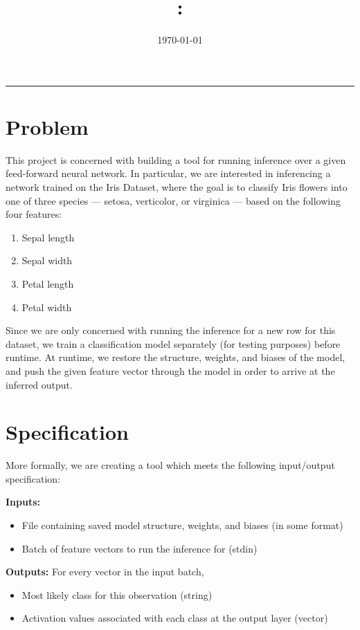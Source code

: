 \documentclass[12pt]{article}
\title{\code: \name}
\author{\me}
\date{\today}
\begin{document}
\maketitle
\hrule \bigskip

\section{Problem}
This project is concerned with building a tool for running inference over a given feed-forward neural network. In particular, we are interested in inferencing a network trained on the Iris Dataset, where the goal is to classify Iris flowers into one of three species --- setosa, verticolor, or virginica --- based on the following four features:
\begin{enumerate}
	\item Sepal length
	\item Sepal width
	\item Petal length
	\item Petal width
\end{enumerate}

Since we are only concerned with running the inference for a new row for this dataset, we train a classification model separately (for testing purposes) before runtime. At runtime, we restore the structure, weights, and biases of the model, and push the given feature vector through the model in order to arrive at the inferred output.

\section{Specification}
More formally, we are creating a tool which meets the following input/output specification:\bigskip

\textbf{Inputs:} 
\begin{itemize}
	\item File containing saved model structure, weights, and biases (in some format)
	\item Batch of feature vectors to run the inference for (stdin)
\end{itemize}

\textbf{Outputs:}
For every vector in the input batch,
\begin{itemize}
	\item Most likely class for this observation (string)
	\item Activation values associated with each class at the output layer (vector)
\end{itemize}
\end{document}
